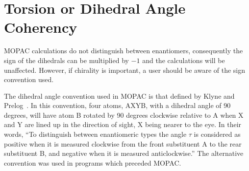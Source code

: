 \section{Torsion or Dihedral Angle Coherency}\label{coherency}
MOPAC  calculations  do  not   distinguish   between   enantiomers,
consequently  the  sign of the dihedrals can be multiplied by $-1$ and the
calculations will be unaffected.  However, if chirality is important,  a user
should be aware of the sign convention used.

The dihedral angle convention used in  MOPAC  is  that  defined  by Klyne and
Prelog~\cite{klyne}.   In this convention,
four atoms, AXYB, with a dihedral angle of 90 degrees, will have atom  B
rotated  by 90 degrees clockwise relative to A when X and Y are lined up in the
direction of sight, X being nearer to the eye.  In  their  words, ``To
distinguish between enantiomeric types the angle $\tau$ is considered as
positive when it is measured clockwise from the front  substituent  A to  
the   rear   substituent  B,  and  negative  when  it  is  measured
anticlockwise.'' The alternative  convention  was  used  in  programs which
preceded MOPAC.
